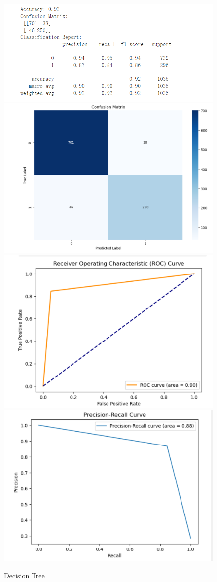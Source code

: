 \documentclass[conference]{IEEEtran}
\begin{document}
\begin{figure}[h]
    \centering
    \includegraphics[width=.4\textwidth]{Desicion_tree/1-1.png}\hfill
    \includegraphics[width=.4\textwidth]{Desicion_tree/1-2.png}
    \includegraphics[width=.4\textwidth]{Desicion_tree/1-3.png}
    \includegraphics[width=.4\textwidth]{Desicion_tree/1-4.png}
    \caption{Decision Tree}\label{Decision Tree}
\end{figure}
\end{document}
